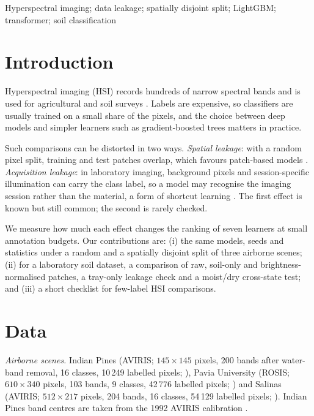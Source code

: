 \documentclass[]{interact}
\begin{document}
\begin{keywords}
Hyperspectral imaging; data leakage; spatially disjoint split; LightGBM; transformer; soil classification
\end{keywords}

\section{Introduction}
Hyperspectral imaging (HSI) records hundreds of narrow spectral bands and is used for agricultural and soil surveys \citep{Bioucas2013}. Labels are expensive, so classifiers are usually trained on a small share of the pixels, and the choice between deep models \citep{Roy2020,Hong2022} and simpler learners such as gradient-boosted trees \citep{Ke2017,Grinsztajn2022} matters in practice.

Such comparisons can be distorted in two ways. \emph{Spatial leakage}: with a random pixel split, training and test patches overlap, which favours patch-based models \citep{Liang2017,Nalepa2019}. \emph{Acquisition leakage}: in laboratory imaging, background pixels and session-specific illumination can carry the class label, so a model may recognise the imaging session rather than the material, a form of shortcut learning \citep{Lapuschkin2019,Geirhos2020}. The first effect is known but still common; the second is rarely checked.

We measure how much each effect changes the ranking of seven learners at small annotation budgets. Our contributions are: (i) the same models, seeds and statistics under a random and a spatially disjoint split of three airborne scenes; (ii) for a laboratory soil dataset, a comparison of raw, soil-only and brightness-normalised patches, a tray-only leakage check and a moist/dry cross-state test; and (iii) a short checklist for few-label HSI comparisons.

\section{Data}\label{sec:data}

\emph{Airborne scenes.} Indian Pines (AVIRIS; $145\times145$ pixels, 200 bands after water-band removal, 16 classes, 10\,249 labelled pixels; \citealt{Baumgardner2015}), Pavia University (ROSIS; $610\times340$ pixels, 103 bands, 9 classes, 42\,776 labelled pixels; \citealt{Gamba2004}) and Salinas (AVIRIS; $512\times217$ pixels, 204 bands, 16 classes, 54\,129 labelled pixels; \citealt{GIC2021}). Indian Pines band centres are taken from the 1992 AVIRIS calibration \citep{Baumgardner2015}.
\end{document}
